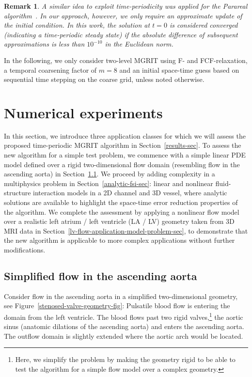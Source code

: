 \documentclass[3p]{elsarticle}
\newtheorem{remark}{Remark}
\begin{document}
\begin{remark}
    A similar idea to exploit time-periodicity was applied
    for the Parareal algorithm~\cite{GanderJiangSongZhang2013,GanderKulchytskaruchkaSchoeps2018}.
    In our approach, however, we only require an \emph{approximate} update of the initial condition.
    In this work, the solution at $t = 0$ is considered converged (indicating a time-periodic steady state)
    if the absolute difference of subsequent approximations is less than $10^{-10}$ in the Euclidean norm.
\end{remark}

In the following, we only consider two-level MGRIT using F- and FCF-relaxation,
a temporal coarsening factor of $m = 8$ and an initial space-time guess
based on sequential time stepping on the coarse grid, unless noted otherwise.
\section{Numerical experiments}\label{numerical-experiments-sec}
In this section, we introduce three application classes
for which we will assess the proposed time-periodic MGRIT algorithm in Section~\ref{results-sec}.
To assess the new algorithm for a simple test problem,
we commence with a simple linear PDE model defined
over a rigid two-dimensional flow domain (resembling flow in the ascending aorta)
in Section~\ref{stenosed-valve-sec}.
We proceed by adding complexity in a multiphysics problem
in Section~\ref{analytic-fsi-sec}:
linear and nonlinear fluid-structure interaction models
in a 2D channel and 3D vessel, where analytic solutions are available
to highlight the space-time error reduction properties of the algorithm.
We complete the assessment by applying a nonlinear flow model
over a realistic left atrium / left ventricle (LA / LV) geometry
taken from 3D MRI data
in Section~\ref{lv-flow-application-model-problem-sec},
to demonstrate that the new algorithm is applicable
to more complex applications without further modifications.
\subsection{Simplified flow in the ascending aorta}
\label{stenosed-valve-sec}

Consider flow in the ascending aorta in a simplified two-dimensional geometry,
see Figure~\ref{stenosed-valve-geometry-fig}:
Pulsatile blood flow is entering the domain from the left ventricle.
The blood flows past two rigid valves,\footnote{Here,
we simplify the problem by making the geometry rigid
to be able to test the algorithm for a simple flow model
over a complex geometry.}
the aortic sinus (anatomic dilations of the ascending aorta)
and enters the ascending aorta.
The outflow domain is slightly extended where the aortic arch would be located.
\end{document}
